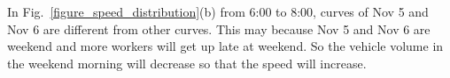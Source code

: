 In Fig.~\ref{figure_speed_distribution}(b) from 6:00 to 8:00, curves of Nov 5 and Nov 6 are different from other curves. This may because Nov 5 and Nov 6 are weekend and more workers will get up late at weekend. So the vehicle volume in the weekend morning will decrease so that the speed will increase. 
